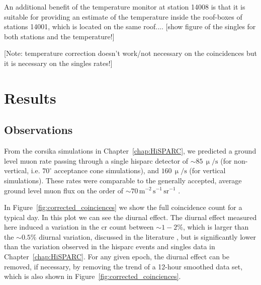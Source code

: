 An additional benefit of the temperature monitor at station 14008 is that it is suitable for providing an estimate of the temperature inside the roof-boxes of stations 14001, which is located on the same roof.... [show figure of the singles for both stations and the temperature!]


[Note: temperature correction doesn't work/not necessary on the coincidences but it is necessary on the singles rates!]





\section{Results}\label{sec:HS_14008_observations}

\subsection{Observations}\label{sec:HS_14008_observations}

From the \gls{corsika} simulations in Chapter~\ref{chap:HiSPARC}, we predicted a ground level muon rate passing through a single \gls{hisparc} detector of $\sim 85 \, \upmu/\mathrm{s}$ (for non-vertical, i.e. $70^\circ$ acceptance cone simulations), and $160 \, \upmu/\mathrm{s}$ (for vertical simulations). These rates were comparable to the generally accepted, average ground level muon flux on the order of $\sim 70 \, \mathrm{m}^{-2}\,\mathrm{s}^{-1}\,\mathrm{sr}^{-1}$ \citep{cecchini_cosmic_2000, blackmore_terrestrial_2015, pereira_ground_2020, particle_data_group_review_2020}.


In Figure~\ref{fig:corrected_coinciences} we show the full coincidence count for a typical day. In this plot we can see the diurnal effect. The diurnal effect measured here induced a variation in the \gls{cr} count between $\sim 1-2 \%$, which is larger than the $\sim 0.5 \%$ diurnal variation, discussed in the literature \citep{mishra_study_2007, mishra_cosmic_2008, dubey_cosmic_2016, thomas_decadal_2017}, but is significantly lower than the variation observed in the \gls{hisparc} events and singles data in Chapter~\ref{chap:HiSPARC}. For any given epoch, the diurnal effect can be removed, if necessary, by removing the trend of a 12-hour smoothed data set, which is also shown in Figure~\ref{fig:corrected_coinciences}.

